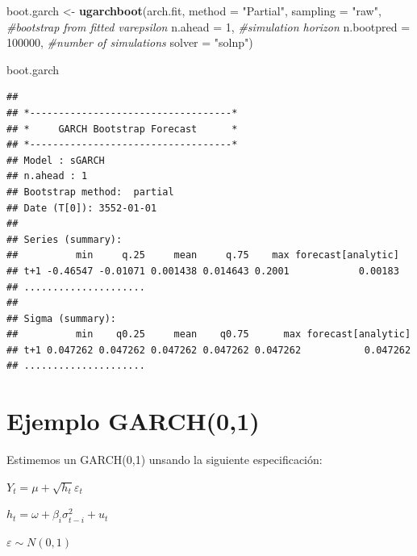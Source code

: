 \documentclass[
]{book}
\newenvironment{Shaded}{\begin{snugshade}}{\end{snugshade}}
\newcommand{\AttributeTok}[1]{\textcolor[rgb]{0.13,0.29,0.53}{#1}}
\newcommand{\CommentTok}[1]{\textcolor[rgb]{0.56,0.35,0.01}{\textit{#1}}}
\newcommand{\DecValTok}[1]{\textcolor[rgb]{0.00,0.00,0.81}{#1}}
\newcommand{\FunctionTok}[1]{\textcolor[rgb]{0.13,0.29,0.53}{\textbf{#1}}}
\newcommand{\NormalTok}[1]{#1}
\newcommand{\OtherTok}[1]{\textcolor[rgb]{0.56,0.35,0.01}{#1}}
\newcommand{\StringTok}[1]{\textcolor[rgb]{0.31,0.60,0.02}{#1}}
\begin{document}
\begin{Shaded}
\begin{Highlighting}[]
\NormalTok{boot.garch }\OtherTok{\textless{}{-}} \FunctionTok{ugarchboot}\NormalTok{(arch.fit,}
                         \AttributeTok{method =} \StringTok{"Partial"}\NormalTok{,}
                         \AttributeTok{sampling =} \StringTok{"raw"}\NormalTok{,  }\CommentTok{\#bootstrap from fitted varepsilon}
                         \AttributeTok{n.ahead =} \DecValTok{1}\NormalTok{,          }\CommentTok{\#simulation horizon}
                         \AttributeTok{n.bootpred =} \DecValTok{100000}\NormalTok{, }\CommentTok{\#number of simulations }
                         \AttributeTok{solver =} \StringTok{"solnp"}\NormalTok{)}

\NormalTok{boot.garch}
\end{Highlighting}
\end{Shaded}

\begin{verbatim}
## 
## *-----------------------------------*
## *     GARCH Bootstrap Forecast      *
## *-----------------------------------*
## Model : sGARCH
## n.ahead : 1
## Bootstrap method:  partial
## Date (T[0]): 3552-01-01
## 
## Series (summary):
##          min     q.25     mean     q.75    max forecast[analytic]
## t+1 -0.46547 -0.01071 0.001438 0.014643 0.2001            0.00183
## .....................
## 
## Sigma (summary):
##          min    q0.25     mean    q0.75      max forecast[analytic]
## t+1 0.047262 0.047262 0.047262 0.047262 0.047262           0.047262
## .....................
\end{verbatim}

\hypertarget{ejemplo-garch01}{%
\section{Ejemplo GARCH(0,1)}\label{ejemplo-garch01}}

Estimemos un GARCH(0,1) unsando la siguiente especificación:

\(Y_t = \mu+\sqrt{h_t}\varepsilon_t\)

\(h_t = \omega+\beta_i \sigma^2_{t-i}+u_t\)

\(\varepsilon \sim N(0,1)\)
\end{document}
